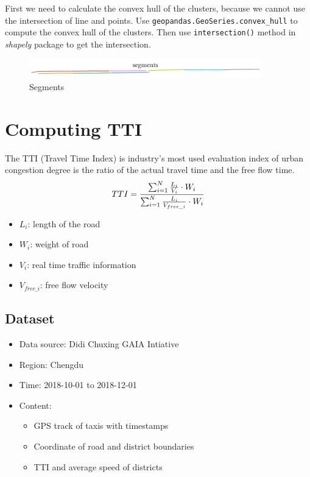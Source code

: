 \documentclass[fontset=none]{ctexart}
\theoremstyle{definition}
\theoremstyle{remark}
\begin{document}
First we need to calculate the convex hull of the clusters, because we cannot use the intersection
of line and points. Use \texttt{geopandas.GeoSeries.convex\_hull} to compute the convex hull of the
clusters. Then use \texttt{intersection()} method in \textit{shapely} package to get the intersection.
\begin{figure}[htb]
  \centering
  \includegraphics[width=0.9\textwidth]{images/segments.png}
  \caption{Segments}
  \label{fig: segments}
\end{figure}

\clearpage
\section{Computing TTI}
The TTI (Travel Time Index) is industry's most used evaluation index of urban congestion degree is the ratio of the actual travel time and the free flow time.
\begin{equation}
  TTI=\frac{\sum_{i=1}^N\frac{L_i}{V_i}\cdot W_i}{\sum_{i=1}^N\frac{L_i}{V_{free\_i}}\cdot W_i} \notag
\end{equation}
\begin{itemize}
  \item $L_i$: length of the road
  \item $W_i$: weight of road
  \item $V_i$: real time traffic information
  \item $V_{free\_i}$: free flow velocity
\end{itemize}

\subsection{Dataset}
\begin{itemize}
    \item Data source: Didi Chuxing GAIA Intiative
    \item Region: Chengdu
    \item Time: 2018-10-01 to 2018-12-01
    \item Content:
        \begin{itemize}
            \item GPS track of taxis with timestamps
            \item Coordinate of road and district boundaries
            \item TTI and average speed of districts
        \end{itemize}
\end{itemize}
\end{document}

